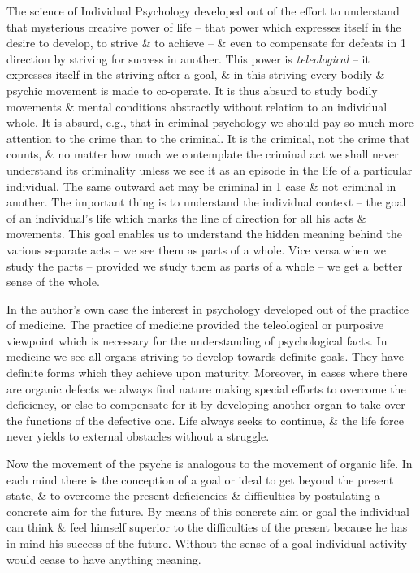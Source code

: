 \documentclass{article}
\begin{document}
The science of Individual Psychology developed out of the effort to understand that mysterious creative power of life -- that power which expresses itself in the desire to develop, to strive \& to achieve -- \& even to compensate for defeats in 1 direction by striving for success in another. This power is \textit{teleological} -- it expresses itself in the striving after a goal, \& in this striving every bodily \& psychic movement is made to co-operate. It is thus absurd to study bodily movements \& mental conditions abstractly without relation to an individual whole. It is absurd, e.g., that in criminal psychology we should pay so much more attention to the crime than to the criminal. It is the criminal, not the crime that counts, \& no matter how much we contemplate the criminal act we shall never understand its criminality unless we see it as an episode in the life of a particular individual. The same outward act may be criminal in 1 case \& not criminal in another. The important thing is to understand the individual context -- the goal of an individual's life which marks the line of direction for all his acts \& movements. This goal enables us to understand the hidden meaning behind the various separate acts -- we see them as parts of a whole. Vice versa when we study the parts -- provided we study them as parts of a whole -- we get a better sense of the whole.

In the author's own case the interest in psychology developed out of the practice of medicine. The practice of medicine provided the teleological or purposive viewpoint which is necessary for the understanding of psychological facts. In medicine we see all organs striving to develop towards definite goals. They have definite forms which they achieve upon maturity. Moreover, in cases where there are organic defects we always find nature making special efforts to overcome the deficiency, or else to compensate for it by developing another organ to take over the functions of the defective one. Life always seeks to continue, \& the life force never yields to external obstacles without a struggle.

Now the movement of the psyche is analogous to the movement of organic life. In each mind there is the conception of a goal or ideal to get beyond the present state, \& to overcome the present deficiencies \& difficulties by postulating a concrete aim for the future. By means of this concrete aim or goal the individual can think \& feel himself superior to the difficulties of the present because he has in mind his success of the future. Without the sense of a goal individual activity would cease to have anything meaning.
\end{document}
